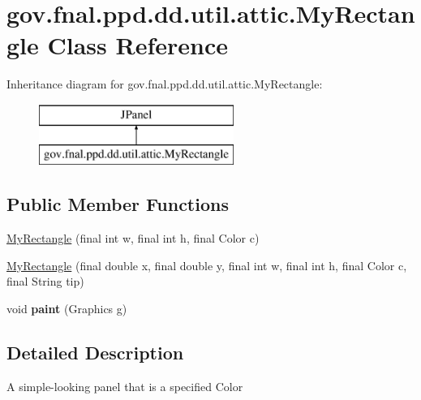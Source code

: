 \hypertarget{classgov_1_1fnal_1_1ppd_1_1dd_1_1util_1_1attic_1_1MyRectangle}{\section{gov.\-fnal.\-ppd.\-dd.\-util.\-attic.\-My\-Rectangle Class Reference}
\label{classgov_1_1fnal_1_1ppd_1_1dd_1_1util_1_1attic_1_1MyRectangle}
}
Inheritance diagram for gov.\-fnal.\-ppd.\-dd.\-util.\-attic.\-My\-Rectangle\-:\begin{figure}[H]
\begin{center}
\leavevmode
\includegraphics[height=2.000000cm]{classgov_1_1fnal_1_1ppd_1_1dd_1_1util_1_1attic_1_1MyRectangle}
\end{center}
\end{figure}
\subsection*{Public Member Functions}
\begin{DoxyCompactItemize}
\item 
\hyperlink{classgov_1_1fnal_1_1ppd_1_1dd_1_1util_1_1attic_1_1MyRectangle_a9ebaf8527d8b10b33cb46f6e5b5857b3}{My\-Rectangle} (final int w, final int h, final Color c)
\item 
\hyperlink{classgov_1_1fnal_1_1ppd_1_1dd_1_1util_1_1attic_1_1MyRectangle_a9808bc06fbfd5b2f43814843b54aebf5}{My\-Rectangle} (final double x, final double y, final int w, final int h, final Color c, final String tip)
\item 
\hypertarget{classgov_1_1fnal_1_1ppd_1_1dd_1_1util_1_1attic_1_1MyRectangle_a7fcbe058d6813c7258c626fd356b9045}{void {\bfseries paint} (Graphics g)}\label{classgov_1_1fnal_1_1ppd_1_1dd_1_1util_1_1attic_1_1MyRectangle_a7fcbe058d6813c7258c626fd356b9045}

\end{DoxyCompactItemize}


\subsection{Detailed Description}
A simple-\/looking panel that is a specified Color


